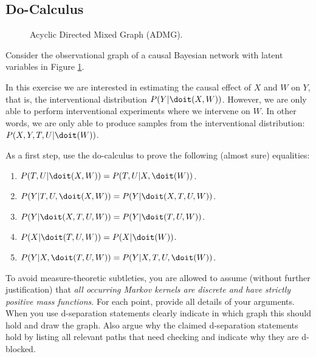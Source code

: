 \subsection{Do-Calculus}

\begin{figure}[ht]
\centering
{}
\caption{Acyclic Directed Mixed Graph (ADMG).}
\label{fig:cadmg-X}
\end{figure}

\noindent Consider the observational graph of a causal Bayesian network with latent variables in Figure \ref{fig:cadmg-X}.

In this exercise we are interested in estimating the causal effect of $X$ and $W$ on $Y$, that is, the interventional distribution $P(Y|\doit(X,W))$. However, we are only able to perform  interventional experiments where we intervene on $W$. In other words, we are only able to produce samples from the interventional distribution: $P(X,Y,T,U|\doit(W))$.

As a first step, use the do-calculus to prove the following (almost sure) equalities:
\begin{enumerate}[label=\alph*)]
    \item $P(T,U|\doit(X,W)) = P(T,U|X,\doit(W))$. 
    \item $P(Y|T,U,\doit(X,W)) = P(Y|\doit(X,T,U,W))$.
    \item $P(Y|\doit(X,T,U,W)) = P(Y|\doit(T,U,W))$.
    \item $P(X|\doit(T,U,W)) = P(X|\doit(W))$.
    \item $P(Y|X,\doit(T,U,W)) = P(Y|X,T,U,\doit(W))$.
\end{enumerate}
To avoid measure-theoretic subtleties, you are allowed to assume (without further justification) that \emph{all occurring Markov kernels are discrete and have strictly positive mass functions}.
For each point, provide all details of your arguments.
When you use d-separation statements clearly indicate in which graph this should hold and draw the graph. Also argue why the claimed d-separation statements hold by listing all relevant paths that need checking and indicate why they are d-blocked.

